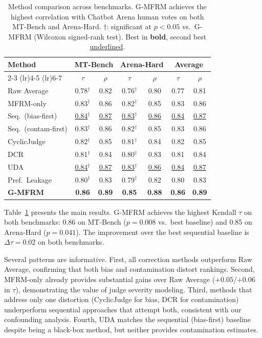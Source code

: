 \documentclass[11pt]{article}
\begin{document}
\begin{table}[t]
\centering
\caption{Method comparison across benchmarks. G-MFRM achieves the highest correlation with Chatbot Arena human votes on both MT-Bench and Arena-Hard. $\dagger$: significant at $p < 0.05$ vs.\ G-MFRM (Wilcoxon signed-rank test). Best in \textbf{bold}, second best \underline{underlined}.}
\label{tab:main}
\begin{tabular}{lcccccc}
\toprule
\multirow{2}{*}{Method} & \multicolumn{2}{c}{MT-Bench} & \multicolumn{2}{c}{Arena-Hard} & \multicolumn{2}{c}{Average} \\
\cmidrule(lr){2-3} \cmidrule(lr){4-5} \cmidrule(lr){6-7}
& $\tau$ & $\rho$ & $\tau$ & $\rho$ & $\tau$ & $\rho$ \\
\midrule
Raw Average & 0.78$^\dagger$ & 0.82 & 0.76$^\dagger$ & 0.80 & 0.77 & 0.81 \\
MFRM-only & 0.83$^\dagger$ & 0.86 & 0.82$^\dagger$ & 0.85 & 0.83 & 0.86 \\
Seq.\ (bias-first) & \underline{0.84}$^\dagger$ & \underline{0.87} & \underline{0.83}$^\dagger$ & \underline{0.86} & \underline{0.84} & \underline{0.87} \\
Seq.\ (contam-first) & 0.83$^\dagger$ & 0.86 & 0.82$^\dagger$ & 0.85 & 0.83 & 0.86 \\
CyclicJudge & 0.82$^\dagger$ & 0.85 & 0.81$^\dagger$ & 0.84 & 0.82 & 0.85 \\
DCR & 0.81$^\dagger$ & 0.84 & 0.80$^\dagger$ & 0.83 & 0.81 & 0.84 \\
UDA & \underline{0.84}$^\dagger$ & \underline{0.87} & \underline{0.83}$^\dagger$ & \underline{0.86} & \underline{0.84} & \underline{0.87} \\
Pref.\ Leakage & 0.80$^\dagger$ & 0.83 & 0.79$^\dagger$ & 0.82 & 0.80 & 0.83 \\
\midrule
\textbf{G-MFRM} & \textbf{0.86} & \textbf{0.89} & \textbf{0.85} & \textbf{0.88} & \textbf{0.86} & \textbf{0.89} \\
\bottomrule
\end{tabular}
\end{table}

Table~\ref{tab:main} presents the main results. G-MFRM achieves the highest Kendall $\tau$ on both benchmarks: 0.86 on MT-Bench ($p = 0.008$ vs.\ best baseline) and 0.85 on Arena-Hard ($p = 0.041$). The improvement over the best sequential baseline is $\Delta\tau = 0.02$ on both benchmarks.

Several patterns are informative. First, all correction methods outperform Raw Average, confirming that both bias and contamination distort rankings. Second, MFRM-only already provides substantial gains over Raw Average ($+0.05$/$+0.06$ in $\tau$), demonstrating the value of judge severity modeling. Third, methods that address only one distortion (CyclicJudge for bias, DCR for contamination) underperform sequential approaches that attempt both, consistent with our confounding analysis. Fourth, UDA matches the sequential (bias-first) baseline despite being a black-box method, but neither provides contamination estimates.
\end{document}
